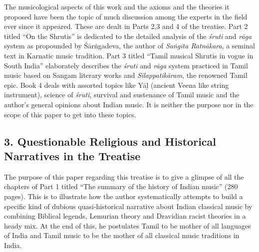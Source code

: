 The musicological aspects of this work and the axioms and the theories it proposed have been the topic of much discussion among the experts in the field ever since it appeared. These are dealt in Parts 2,3 and 4 of the treatise. Part 2 titled “On the Shrutis” is dedicated to the detailed analysis of the \textit{śruti} and \textit{rāga} system as propounded by Śārṅgadeva, the author of \textit{Saṅgīta Ratnākara}, a seminal text in Karnatic music tradition. Part 3 titled “Tamil musical Shrutis in vogue in South India” elaborately describes the \textit{śruti} and \textit{rāga} system practiced in Tamil music based on Sangam literary works and \textit{Silappatikāram}, the renowned Tamil epic. Book 4 deals with assorted topics like Yāḻ (ancient Veena like string instrument), science of \textit{śruti}, survival and sustenance of Tamil music and the author’s general opinions about Indian music. It is neither the purpose nor in the scope of this paper to get into these topics.

\vspace{-.2cm}

\subsection*{3. Questionable Religious and Historical Narratives in the Treatise}

The purpose of this paper regarding this treatise is to give a glimpse of all the chapters of Part 1 titled “The summary of the history of Indian music” (280 pages). This is to illustrate how the author systematically attempts to build a specific kind of dubious quasi-historical narrative about Indian classical music by combining Biblical legends, Lemurian theory and Dravidian racist theories in a heady mix. At the end of this, he postulates Tamil to be mother of all languages of India and Tamil music to be the mother of all classical music traditions in India.

